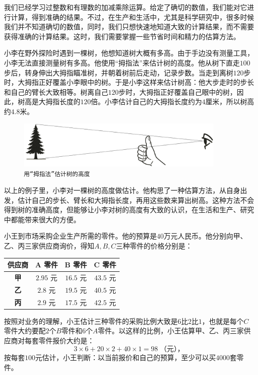 \documentclass[12pt,UTF8]{ctexbook}
\begin{document}
我们已经学习过整数和有理数的加减乘除运算。给定了确切的数值，我们能对它进行计算，得到准确的结果。不过，在生产和生活中，尤其是科学研究中，很多时候我们并不知道确切的数值，同时，我们只想快速地知道大致的计算结果，而不需要获得准确的计算结果。这时，我们需要掌握一些节省时间和精力的估算方法。

\begin{ex}
    小李在野外探险时遇到一棵树，他想知道树大概有多高。由于手边没有测量工具，小李无法直接测量树有多高。他使用“拇指法”来估计树的高度。他从树下直走$100$步后，转身伸出大拇指瞄准树，并朝着树前后走动，记录步数。当走到离树$120$步时，大拇指正好覆盖小李眼中的树。于是小李这样来估计树高：他大步走时的步长和自己的臂长大致相等。树离自己$120$步时，大拇指正好覆盖自己眼中的树，因此，树高是大拇指长度的$120$倍。小李估计自己的大拇指长度约为$4$厘米，所以树高约$4.8$米。
\end{ex}

\begin{figure}[h]
    \vspace{4pt}
    \centering
    \includegraphics[width=0.9\textwidth]{tu/tree_measure1.png}
    \caption*{\texttt{用“拇指法”估计树的高度}}
\end{figure}

以上的例子里，小李对一棵树的高度做估计。他构思了一种估算方法，从自身出发，估计自己的步长、臂长和大拇指长度，再用这些数来算出树高。这种方法不会得到树的准确高度，但能够让小李对树的高度有大致的认识，在生活和生产、研究中都能带来很大的方便。

\begin{ex}
    小王到市场采购企业生产所需的零件。他的预算是$40$万元人民币。他分别向甲、乙、丙三家供应商询价，得知$A,B,C$三种零件的价格分别是：
    \begin{table}[htbp]
        \centering
        \label{tab:报价表}
        \begin{tabular}{|c|c|c|c|}
            \hline
            \textbf{供应商} & \textbf{A 零件} & \textbf{B 零件} & \textbf{C 零件} \\
            \hline
            \textbf{甲} & $2.95$ 元 & $16.5$ 元 & $43.5$ 元 \\
            \hline
            \textbf{乙} & $2.8$ 元 & $19.5$ 元 & $40.5$ 元 \\
            \hline
            \textbf{丙} & $2.9$ 元 & $17.5$ 元 & $42.5$ 元 \\
            \hline
        \end{tabular}
    \end{table}

    按照对业务的理解，小王估计三种零件的采购比例大致是$6$比$2$比$1$，也就是每个$C$零件大约要配$2$个$B$零件和$6$个$A$零件。以这样的比例，小王估算甲、乙、丙三家供应商对每套零件报价大约是：
    $$ 3\times 6 + 20 \times 2 + 40\times 1 = 98 \;\mbox{（元），} $$
    按每套$100$元估计，小王判断：以当前报价和自己的预算，至少可以买$4000$套零件。
\end{ex}
\end{document}
